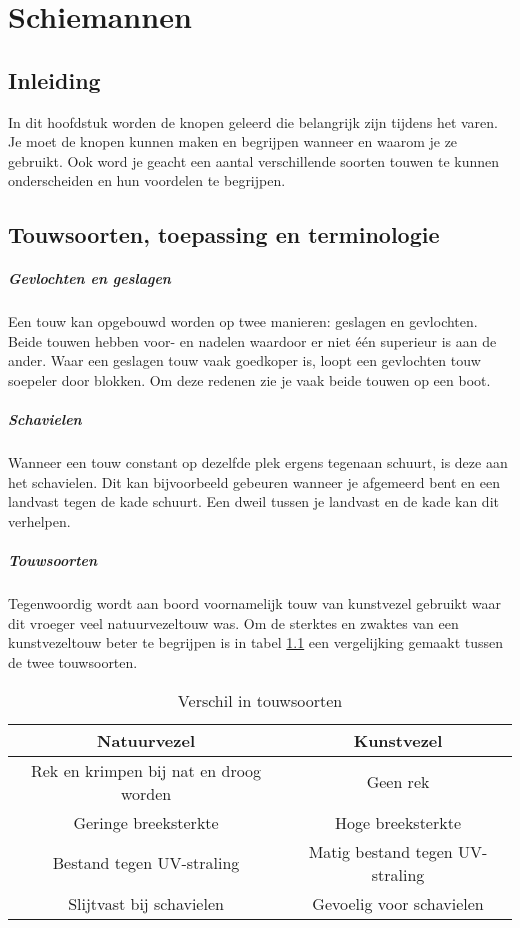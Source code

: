 \chapter{Schiemannen}
\section{Inleiding}
In dit hoofdstuk worden de knopen geleerd die belangrijk zijn tijdens het varen. Je moet de knopen kunnen maken en begrijpen wanneer en waarom je ze gebruikt. Ook word je geacht een aantal verschillende soorten touwen te kunnen onderscheiden en hun voordelen te begrijpen.

\section{Touwsoorten, toepassing en terminologie}

\paragraph{Gevlochten en geslagen}
Een touw kan opgebouwd worden op twee manieren: geslagen en gevlochten. Beide touwen hebben voor- en nadelen waardoor er niet één superieur is aan de ander. Waar een geslagen touw vaak goedkoper is, loopt een gevlochten touw soepeler door blokken. Om deze redenen zie je vaak beide touwen op een boot.

\paragraph{Schavielen}
Wanneer een touw constant op dezelfde plek ergens tegenaan schuurt, is deze aan het schavielen. Dit kan bijvoorbeeld gebeuren wanneer je afgemeerd bent en een landvast tegen de kade schuurt. Een dweil tussen je landvast en de kade kan dit verhelpen.

\paragraph{Touwsoorten}
Tegenwoordig wordt aan boord voornamelijk touw van kunstvezel gebruikt waar dit vroeger veel natuurvezeltouw was. Om de sterktes en zwaktes van een kunstvezeltouw beter te begrijpen is in tabel \ref{table:touwwerk} een vergelijking gemaakt tussen de twee touwsoorten.

\begin{table}[h]
	\centering
	\caption{Verschil in touwsoorten}
	\label{table:touwwerk}
	\begin{tabular}{c|c}
		\textbf{Natuurvezel} & \textbf{Kunstvezel} \\ \hline
		Rek en krimpen bij nat en droog worden & Geen rek \\ \hline
		Geringe breeksterkte & Hoge breeksterkte \\ \hline
		Bestand tegen UV-straling & Matig bestand tegen UV-straling \\ \hline
		Slijtvast bij schavielen & Gevoelig voor schavielen
	\end{tabular}
\end{table}

